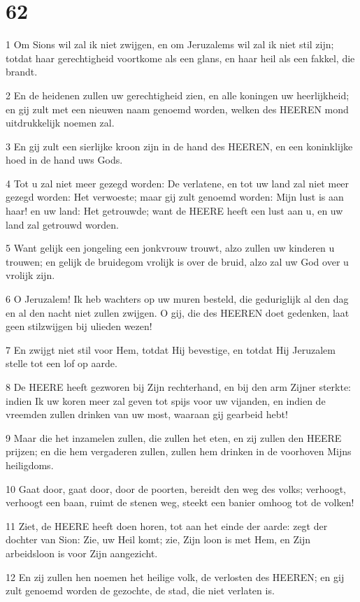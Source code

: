 \chapter{62}

\par 1 Om Sions wil zal ik niet zwijgen, en om Jeruzalems wil zal ik niet stil zijn; totdat haar gerechtigheid voortkome als een glans, en haar heil als een fakkel, die brandt.
\par 2 En de heidenen zullen uw gerechtigheid zien, en alle koningen uw heerlijkheid; en gij zult met een nieuwen naam genoemd worden, welken des HEEREN mond uitdrukkelijk noemen zal.
\par 3 En gij zult een sierlijke kroon zijn in de hand des HEEREN, en een koninklijke hoed in de hand uws Gods.
\par 4 Tot u zal niet meer gezegd worden: De verlatene, en tot uw land zal niet meer gezegd worden: Het verwoeste; maar gij zult genoemd worden: Mijn lust is aan haar! en uw land: Het getrouwde; want de HEERE heeft een lust aan u, en uw land zal getrouwd worden.
\par 5 Want gelijk een jongeling een jonkvrouw trouwt, alzo zullen uw kinderen u trouwen; en gelijk de bruidegom vrolijk is over de bruid, alzo zal uw God over u vrolijk zijn.
\par 6 O Jeruzalem! Ik heb wachters op uw muren besteld, die geduriglijk al den dag en al den nacht niet zullen zwijgen. O gij, die des HEEREN doet gedenken, laat geen stilzwijgen bij ulieden wezen!
\par 7 En zwijgt niet stil voor Hem, totdat Hij bevestige, en totdat Hij Jeruzalem stelle tot een lof op aarde.
\par 8 De HEERE heeft gezworen bij Zijn rechterhand, en bij den arm Zijner sterkte: indien Ik uw koren meer zal geven tot spijs voor uw vijanden, en indien de vreemden zullen drinken van uw most, waaraan gij gearbeid hebt!
\par 9 Maar die het inzamelen zullen, die zullen het eten, en zij zullen den HEERE prijzen; en die hem vergaderen zullen, zullen hem drinken in de voorhoven Mijns heiligdoms.
\par 10 Gaat door, gaat door, door de poorten, bereidt den weg des volks; verhoogt, verhoogt een baan, ruimt de stenen weg, steekt een banier omhoog tot de volken!
\par 11 Ziet, de HEERE heeft doen horen, tot aan het einde der aarde: zegt der dochter van Sion: Zie, uw Heil komt; zie, Zijn loon is met Hem, en Zijn arbeidsloon is voor Zijn aangezicht.
\par 12 En zij zullen hen noemen het heilige volk, de verlosten des HEEREN; en gij zult genoemd worden de gezochte, de stad, die niet verlaten is.

